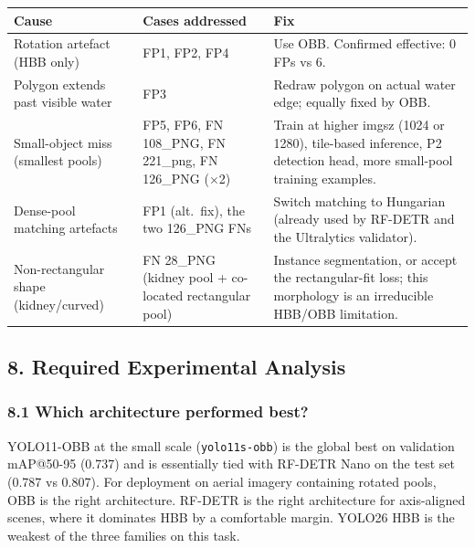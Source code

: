 \documentclass[11pt
]{article}
\newcounter{none} %
\begin{document}
{\def\LTcaptype{none}
\begin{longtable}[]{@{}
  >{\raggedright\arraybackslash}p{}
  >{\raggedright\arraybackslash}p{}
  >{\raggedright\arraybackslash}p{}@{}}
\toprule\noalign{}
\begin{minipage}[b]{\linewidth}\raggedright
Cause
\end{minipage} & \begin{minipage}[b]{\linewidth}\raggedright
Cases addressed
\end{minipage} & \begin{minipage}[b]{\linewidth}\raggedright
Fix
\end{minipage} \\
\midrule\noalign{}
\endhead
\bottomrule\noalign{}
\endlastfoot
Rotation artefact (HBB only) & FP1, FP2, FP4 & Use OBB. Confirmed
effective: 0 FPs vs 6. \\
Polygon extends past visible water & FP3 & Redraw polygon on actual
water edge; equally fixed by OBB. \\
Small-object miss (smallest pools) & FP5, FP6, FN 108\_PNG, FN
221\_png, FN 126\_PNG ($\times$2) & Train at higher imgsz (1024 or
1280), tile-based inference, P2 detection head, more small-pool training
examples. \\
Dense-pool matching artefacts & FP1 (alt.~fix), the two 126\_PNG FNs
& Switch matching to Hungarian (already used by RF-DETR and the
Ultralytics validator). \\
Non-rectangular shape (kidney/curved) & FN 28\_PNG (kidney pool +
co-located rectangular pool) & Instance segmentation, or accept the
rectangular-fit loss; this morphology is an irreducible HBB/OBB
limitation. \\
\end{longtable}
}

\subsection{8. Required Experimental
Analysis}\label{required-experimental-analysis}

\subsubsection{8.1 Which architecture performed
best?}\label{which-architecture-performed-best}

YOLO11-OBB at the small scale (\texttt{yolo11s-obb}) is the global best
on validation mAP@50-95 (0.737) and is essentially tied with RF-DETR
Nano on the test set (0.787 vs 0.807). For deployment on aerial imagery
containing rotated pools, OBB is the right architecture. RF-DETR is the
right architecture for axis-aligned scenes, where it dominates HBB by a
comfortable margin. YOLO26 HBB is the weakest of the three families on
this task.
\end{document}
